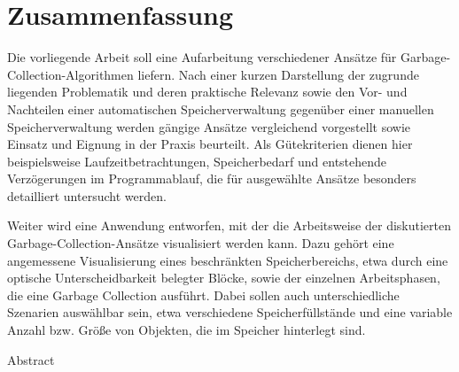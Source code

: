 %
\chapter*{Zusammenfassung}
\label{sec:abstract}
\vspace*{-10mm}

Die vorliegende Arbeit soll eine Aufarbeitung verschiedener Ansätze für Garbage-Collection-Algorithmen liefern.
Nach einer kurzen Darstellung der zugrunde liegenden Problematik und deren praktische Relevanz sowie den Vor- und Nachteilen einer automatischen Speicherverwaltung gegenüber einer manuellen Speicherverwaltung werden gängige Ansätze vergleichend vorgestellt sowie Einsatz und Eignung in der Praxis beurteilt.
Als Gütekriterien dienen hier beispielsweise Laufzeitbetrachtungen, Speicherbedarf und entstehende Verzögerungen im Programmablauf, die für ausgewählte Ansätze besonders detailliert untersucht werden.

Weiter wird eine Anwendung entworfen, mit der die Arbeitsweise der diskutierten Garbage-Collection-Ansätze visualisiert werden kann.
Dazu gehört eine angemessene Visualisierung eines beschränkten Speicherbereichs, etwa durch eine optische Unterscheidbarkeit belegter Blöcke, sowie der einzelnen Arbeitsphasen, die eine Garbage Collection ausführt.
Dabei sollen auch unterschiedliche Szenarien auswählbar sein, etwa verschiedene Speicherfüllstände und eine variable Anzahl bzw. Größe von Objekten, die im Speicher hinterlegt sind.


\vspace*{20mm}

{Abstract}\label{sec:abstract-diff} \\
